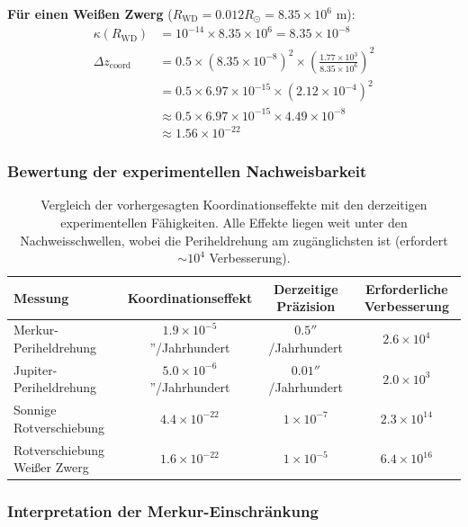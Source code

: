 \documentclass[11pt,a4paper]{article}
\begin{document}
	\textbf{Für einen Weißen Zwerg} ($R_{\text{WD}} = 0.012 R_\odot = 8.35 \times 10^6$ m):
	\begin{align}
		\kappa(R_{\text{WD}}) &= 10^{-14} \times 8.35 \times 10^6 = 8.35 \times 10^{-8} \\
		\Delta z_{\text{coord}} &= 0.5 \times (8.35 \times 10^{-8})^2 \times \left(\frac{1.77 \times 10^3}{8.35 \times 10^6}\right)^2 \\
		&= 0.5 \times 6.97 \times 10^{-15} \times (2.12 \times 10^{-4})^2 \\
		&\approx 0.5 \times 6.97 \times 10^{-15} \times 4.49 \times 10^{-8} \\
		&\approx 1.56 \times 10^{-22}
	\end{align}
	
	\subsubsection{Bewertung der experimentellen Nachweisbarkeit}
	
	\begin{table}[htbp]
		\centering
		\begin{tabular}{lccc}
			\toprule
			\textbf{Messung} & \textbf{Koordinationseffekt} & \textbf{Derzeitige Präzision} & \textbf{Erforderliche Verbesserung} \\
			\midrule
			Merkur-Periheldrehung & $1.9 \times 10^{-5}$''/Jahrhundert & $0.5''$/Jahrhundert & $2.6 \times 10^4$ \\
			Jupiter-Periheldrehung & $5.0 \times 10^{-6}$''/Jahrhundert & $0.01''$/Jahrhundert & $2.0 \times 10^3$ \\
			Sonnige Rotverschiebung & $4.4 \times 10^{-22}$ & $1 \times 10^{-7}$ & $2.3 \times 10^{14}$ \\
			Rotverschiebung Weißer Zwerg & $1.6 \times 10^{-22}$ & $1 \times 10^{-5}$ & $6.4 \times 10^{16}$ \\
			\bottomrule
		\end{tabular}
		\caption{Vergleich der vorhergesagten Koordinationseffekte mit den derzeitigen experimentellen Fähigkeiten. 
			Alle Effekte liegen weit unter den Nachweisschwellen, wobei die Periheldrehung am zugänglichsten ist (erfordert $\sim 10^4$ Verbesserung).}
	\end{table}
	
	\subsubsection{Interpretation der Merkur-Einschränkung}
	
\end{document}
